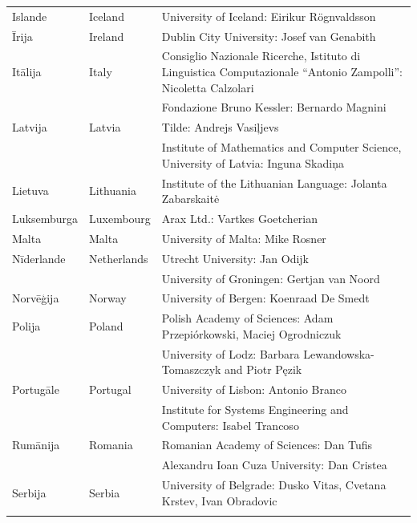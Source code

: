 \begin{longtable}{llp{105mm}}
  Islande  & \textcolor{grey1}{Iceland} & University of Iceland: Eirikur Rögnvaldsson \\ \addlinespace
  Īrija  & \textcolor{grey1}{Ireland} & Dublin City University: Josef van Genabith \\ \addlinespace 
  Itālija  & \textcolor{grey1}{Italy} & Consiglio Nazionale Ricerche,  Istituto di Linguistica Computazionale “Antonio Zampolli”: Nicoletta Calzolari \\  \addlinespace
  & & Fondazione Bruno Kessler: Bernardo Magnini \\ \addlinespace
  Latvija  & \textcolor{grey1}{Latvia} & Tilde: Andrejs Vasiļjevs \\ \addlinespace
    & & Institute of Mathematics and Computer Science, University of Latvia: Inguna Skadiņa \\ \addlinespace
  Lietuva  & \textcolor{grey1}{Lithuania} & Institute of the Lithuanian Language: Jolanta Zabarskaitė\\ \addlinespace
  Luksemburga  & \textcolor{grey1}{Luxembourg} & Arax Ltd.: Vartkes Goetcherian \\ \addlinespace
  Malta  & \textcolor{grey1}{Malta} & University of Malta: Mike Rosner \\ \addlinespace 
  Nīderlande  & \textcolor{grey1}{Netherlands} & Utrecht University: Jan Odijk \\ \addlinespace
  & & University of Groningen: Gertjan van Noord \\ \addlinespace
  Norvēģija  & \textcolor{grey1}{Norway} & University of Bergen: Koenraad De Smedt \\ \addlinespace
  Polija  & \textcolor{grey1}{Poland} & Polish Academy of Sciences: Adam Przepiórkowski, Maciej Ogrodniczuk \\ \addlinespace 
  & & University of Lodz: Barbara Lewandowska-Tomaszczyk and Piotr Pęzik \\ \addlinespace 
  Portugāle  & \textcolor{grey1}{Portugal} & University of Lisbon: Antonio Branco \\ \addlinespace 
  & & Institute for Systems Engineering and Computers: Isabel Trancoso \\ \addlinespace
  Rumānija  & \textcolor{grey1}{Romania} & Romanian Academy of Sciences: Dan Tufis \\ \addlinespace
  & & Alexandru Ioan Cuza University: Dan Cristea \\ \addlinespace
  Serbija  & \textcolor{grey1}{Serbia} & University of Belgrade: Dusko Vitas, Cvetana Krstev, Ivan Obradovic \\ \addlinespace

\end{longtable}
